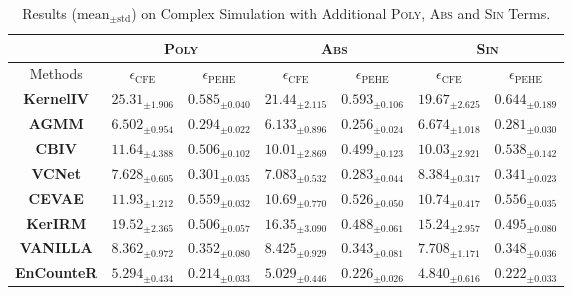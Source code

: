 \documentclass[journal]{IEEEtran}
\begin{document}
\begin{table}[t]
{
\caption{Results ($\text{mean}_{\pm \text{std}}$) on Complex Simulation with Additional \textsc{Poly}, \textsc{Abs} and \textsc{Sin} Terms.}
\label{tab:nonlinear}
\begin{center}
\setlength{\tabcolsep}{2mm}
{
\begin{tabular}{c|cc|cc|cc}
\toprule
 & \multicolumn{2}{c|}{\bf \textsc{Poly}} & \multicolumn{2}{c|}{\bf \textsc{Abs}}
& \multicolumn{2}{c}{\bf \textsc{Sin}} \\
\midrule
Methods & \bf
$\epsilon_{\text{CFE}}$ & \bf $\epsilon_{\text{PEHE}}$ & \bf $\epsilon_{\text{CFE}}$ & \bf $\epsilon_{\text{PEHE}}$ & \bf $\epsilon_{\text{CFE}}$ & \bf $\epsilon_{\text{PEHE}}$ \\
\midrule

\bf KernelIV & $ 25.31_{\pm 1.906} $ & $ 0.585_{\pm 0.040} $  & $ 21.44_{\pm 2.115} $ & $ 0.593_{\pm 0.106} $  & $ 19.67_{\pm 2.625} $ & $ 0.644_{\pm 0.189} $ \\
\bf AGMM & \underline{$ 6.502_{\pm 0.954} $} & \underline{$ 0.294_{\pm 0.022} $}  & \underline{$ 6.133_{\pm 0.896} $} & \underline{$ 0.256_{\pm 0.024} $}  & \underline{$ 6.674_{\pm 1.018} $} & \underline{$ 0.281_{\pm 0.030} $} \\
\bf CBIV & $ 11.64_{\pm 4.388} $ & $ 0.506_{\pm 0.102} $  & $ 10.01_{\pm 2.869} $ & $ 0.499_{\pm 0.123} $  & $ 10.03_{\pm 2.921} $ & $ 0.538_{\pm 0.142} $ \\

\midrule

\bf VCNet & $ 7.628_{\pm 0.605} $ & $ 0.301_{\pm 0.035} $  & $ 7.083_{\pm 0.532} $ & $ 0.283_{\pm 0.044} $  & $ 8.384_{\pm 0.317} $ & $ 0.341_{\pm 0.023} $ \\
\bf CEVAE & $ 11.93_{\pm 1.212} $ & $ 0.559_{\pm 0.032} $  & $ 10.69_{\pm 0.770} $ & $ 0.526_{\pm 0.050} $  & $ 10.74_{\pm 0.417} $ & $ 0.556_{\pm 0.035} $ \\
\bf KerIRM & $ 19.52_{\pm 2.365} $ & $ 0.506_{\pm 0.057} $  & $ 16.35_{\pm 3.090} $ & $ 0.488_{\pm 0.061} $  & $ 15.24_{\pm 2.957} $ & $ 0.495_{\pm 0.080} $ \\

\midrule

\bf VANILLA & 
$ 8.362_{\pm 0.972} $ & $ 0.352_{\pm 0.080} $ 
& $ 8.425_{\pm 0.929} $ & $ 0.343_{\pm 0.081} $ 
& $ 7.708_{\pm 1.171} $ & $ 0.348_{\pm 0.036} $ 
\\

\bf EnCounteR  & 
$ \mathbf{ 5.294_{\pm 0.434} } $ & $ \mathbf{ 0.214_{\pm 0.033} } $ 
& $ \mathbf{ 5.029_{\pm 0.446} } $ & $ \mathbf{ 0.226_{\pm 0.026} } $ 
& $ \mathbf{ 4.840_{\pm 0.616} } $ & $ \mathbf{ 0.222_{\pm 0.033} } $ 
\\
 
\bottomrule
\end{tabular}
}
\end{center}
}

\end{table}
\end{document}
